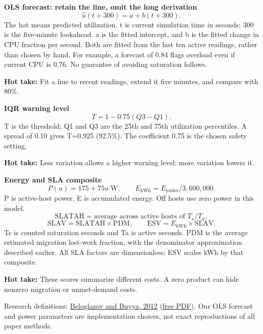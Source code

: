 \documentclass[11pt,a4paper]{article}
\newcommand{\hot}[1]{\par\textbf{Hot take:} #1\par}
\begin{document}
\textbf{OLS forecast: retain the line, omit the long derivation}
\[\widehat{u}(t+300)=a+b(t+300).\]
The hat means predicted utilization. t is current simulation time in seconds; 300 is the five-minute lookahead. a is the fitted intercept, and b is the fitted change in CPU fraction per second. Both are fitted from the last ten active readings, rather than chosen by hand. For example, a forecast of 0.84 flags overload even if current CPU is 0.76. No guarantee of avoiding saturation follows.
\hot{Fit a line to recent readings, extend it five minutes, and compare with 80\%.}

\textbf{IQR warning level}
\[T=1-0.75(Q3-Q1).\]
T is the threshold; Q1 and Q3 are the 25th and 75th utilization percentiles. A spread of 0.10 gives T=0.925 (92.5\%). The coefficient 0.75 is the chosen safety setting.
\hot{Less variation allows a higher warning level; more variation lowers it.}

\textbf{Energy and SLA composite}
\[P(u)=175+75u\;\mathrm{W},\qquad E_{\mathrm{kWh}}=E_{\mathrm{joules}}/3{,}600{,}000.\]
P is active-host power, E is accumulated energy. Off hosts use zero power in this model.
\[\mathrm{SLATAH}=\text{average across active hosts of }T_s/T_a,\]
\[\mathrm{SLAV}=\mathrm{SLATAH}\times\mathrm{PDM},\qquad
\mathrm{ESV}=E_{\mathrm{kWh}}\times\mathrm{SLAV}.\]
Ts is counted saturation seconds and Ta is active seconds. PDM is the average estimated migration lost-work fraction, with the denominator approximation described earlier. All SLA factors are dimensionless; ESV scales kWh by that composite.
\hot{These scores summarize different costs. A zero product can hide nonzero migration or unmet-demand costs.}
Research definitions: \href{https://doi.org/10.1002/cpe.1867}{Beloglazov and Buyya, 2012} (\href{https://beloglazov.info/papers/2012-optimal-algorithms-ccpe.pdf}{free PDF}). Our OLS forecast and power parameters are implementation choices, not exact reproductions of all paper methods.

\newpage
\end{document}
